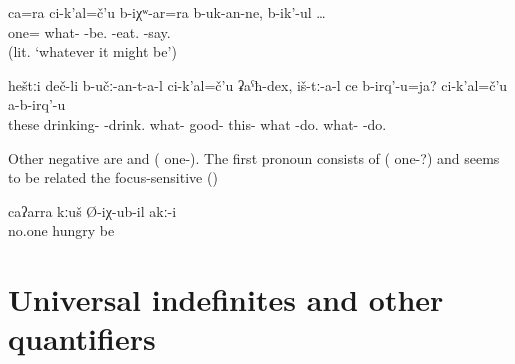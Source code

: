 \begin{exe}
	\ex	\label{saying that they will also eat no matter what} 
	\gll	ca=ra	ci-k'al=č'u	b-iχʷ-ar=ra	b-uk-an-ne,	b-ik'-ul	…\\
		one=	what-	-be.	-eat.	-say.\\
	\glt	{} (lit. `whatever it might be')
	
		\ex	\label{The ones who are drinking anything good, what do they do? They do not do anything (good).} 
	\gll	heštːi	deč-li	b-učː-an-t-a-l	ci-k'al=č'u	ʡaˁħ-dex,	iš-tː-a-l	ce	b-irq'-u=ja?		ci-k'al=č'u	a-b-irq'-u\\
		these	drinking-	-drink.	what-	good-	this-	what	-do.		what-	-do.\\
	\glt	{} 
	\end{exe}

Other negative  are   and   ( one-). The first pronoun consists of ( one-?) and seems to be related the focus-sensitive    ()
%
\begin{exe}
	\ex	\label{ex:No one was hungry}
	\gll	caʔarra	kːuš	Ø-iχ-ub-il	akː-i\\
		no.one	hungry	be	\\
	\glt	{}
\end{exe}



\section{Universal indefinites and other quantifiers}
\label{sec:Universal indefinites and other quantifiers}

